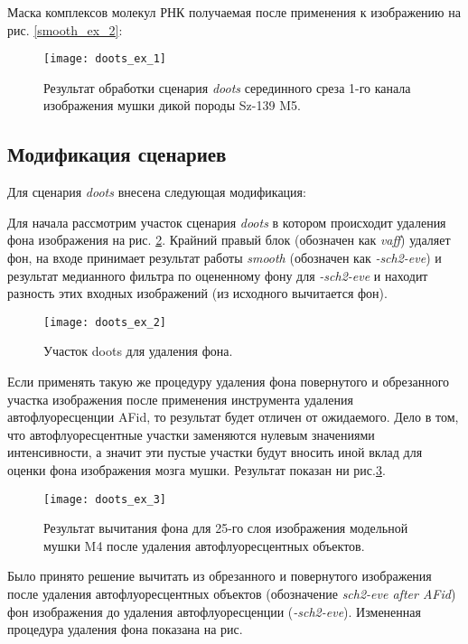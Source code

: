 Маска комплексов молекул РНК получаемая после применения к изображению на рис. \ref{smooth_ex_2}:

\begin{figure}[H]
	\centering
	\texttt{[image: doots\_ex\_1]}
	\caption{Результат обработки сценария \textit{doots} серединного среза 1-го канала изображения мушки дикой породы Sz-139 M5.}
	\label{doots_ex_1}
\end{figure}


\subsection{Модификация сценариев}
Для сценария \textit{doots} внесена следующая модификация: 

Для начала рассмотрим участок сценария \textit{doots} в котором происходит удаления фона изображения на рис. \ref{doots_ex_2}. Крайний правый блок (обозначен как \textit{vaff}) удаляет фон, на входе принимает результат работы \textit{smooth} (обозначен как \textit{-sch2-eve}) и результат медианного фильтра по оцененному фону для \textit{-sch2-eve} и находит разность этих входных изображений (из исходного вычитается фон).

\begin{figure}[H]
	\centering
	\texttt{[image: doots\_ex\_2]}
	\caption{Участок doots для удаления фона.}
	\label{doots_ex_2}
\end{figure}

Если применять такую же процедуру удаления фона повернутого и обрезанного участка изображения после применения инструмента удаления автофлуоресценции AFid, то результат будет отличен от ожидаемого. Дело в том, что автофлуоресцентные участки заменяются нулевым значениями интенсивности, а значит эти пустые участки будут вносить иной вклад для оценки фона изображения мозга мушки. Результат показан ни рис.\ref{doots_ex_3}.

\begin{figure}[H]
	\centering
	\texttt{[image: doots\_ex\_3]}
	\caption{Результат вычитания фона для 25-го слоя изображения модельной мушки M4 после удаления автофлуоресцентных объектов.}
	\label{doots_ex_3}
\end{figure}

Было принято решение вычитать из обрезанного и повернутого изображения после удаления автофлуоресцентных объектов (обозначение \textit{sch2-eve after AFid}) фон изображения до удаления автофлуоресценции (\textit{-sch2-eve}). Измененная процедура удаления фона показана на рис. 

